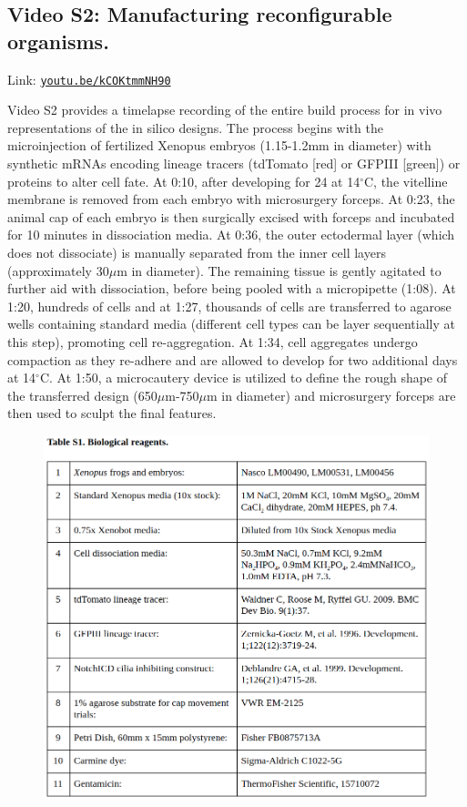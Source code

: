 \subsection*{Video S2: Manufacturing reconfigurable organisms.}

Link:
\href{https://youtu.be/kCOKtmmNH90}{\tt\color{blue}youtu.be/kCOKtmmNH90}

\vspace{1em}

Video S2 provides a timelapse recording of the entire build process for in vivo representations of the in silico designs. 
The process begins with the microinjection of fertilized Xenopus embryos (1.15-1.2mm in diameter) with synthetic mRNAs encoding lineage tracers (tdTomato [red] or GFPIII [green]) or proteins to alter cell fate. At 0:10, after developing for 24 at 14{$^{\circ}$}C, the vitelline membrane is removed from each embryo with microsurgery forceps. 
At 0:23, the animal cap of each embryo is then surgically excised with forceps and incubated for 10 minutes in dissociation media. 
At 0:36, the outer ectodermal layer (which does not dissociate) is manually separated from the inner cell layers (approximately 30{$\mu$}m in diameter). The remaining tissue is gently agitated to further aid with dissociation, before being pooled with a micropipette (1:08). 
At 1:20, hundreds of cells and at 1:27, thousands of cells are transferred to agarose wells containing standard media (different cell types can be layer sequentially at this step), promoting cell re-aggregation. 
At 1:34, cell aggregates undergo compaction as they re-adhere and are allowed to develop for two additional days at 14{$^{\circ}$}C. 
At 1:50, a microcautery device is utilized to define the rough shape of the transferred design (650{$\mu$}m-750{$\mu$}m in diameter) and microsurgery forceps are then used to sculpt the final features.


\begin{figure}[t]
\centering
\includegraphics[width=\linewidth]{Chapter07/img/Table1.png}
\end{figure}

